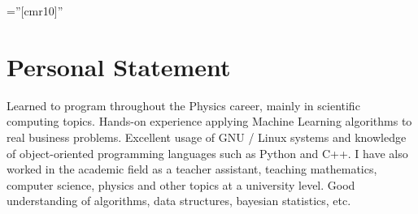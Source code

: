 \documentclass[a4paper,10pt]{article} %
\begin{document}
\pagestyle{empty} %
\BgThispage
\font\fb=''[cmr10]'' %

\small





\par{\bigskip\par} %
\par{\bigskip\par}
\par{\bigskip\par}


\bigskip
\section{Personal Statement}
\bigskip
Learned to program throughout the Physics career, mainly in scientific computing topics. Hands-on experience applying Machine Learning algorithms to real business problems. Excellent usage of GNU / Linux systems and knowledge of object-oriented programming languages such as Python and C++. I have also worked in the academic field as a teacher assistant, teaching mathematics, computer science, physics and other topics at a university level. Good understanding of algorithms, data structures, bayesian statistics, etc.
\end{document}

